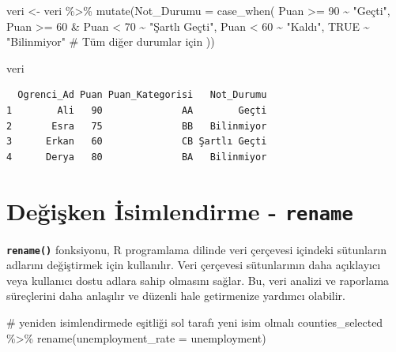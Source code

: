 \documentclass[
  letterpaper,
  DIV=11,
  numbers=noendperiod]{scrreprt}
\newenvironment{Shaded}{\begin{snugshade}}{\end{snugshade}}
\newcommand{\AttributeTok}[1]{\textcolor[rgb]{0.40,0.45,0.13}{#1}}
\newcommand{\CommentTok}[1]{\textcolor[rgb]{0.37,0.37,0.37}{#1}}
\newcommand{\ConstantTok}[1]{\textcolor[rgb]{0.56,0.35,0.01}{#1}}
\newcommand{\DecValTok}[1]{\textcolor[rgb]{0.68,0.00,0.00}{#1}}
\newcommand{\FunctionTok}[1]{\textcolor[rgb]{0.28,0.35,0.67}{#1}}
\newcommand{\NormalTok}[1]{\textcolor[rgb]{0.00,0.23,0.31}{#1}}
\newcommand{\OtherTok}[1]{\textcolor[rgb]{0.00,0.23,0.31}{#1}}
\newcommand{\SpecialCharTok}[1]{\textcolor[rgb]{0.37,0.37,0.37}{#1}}
\newcommand{\StringTok}[1]{\textcolor[rgb]{0.13,0.47,0.30}{#1}}
\begin{document}
\begin{Shaded}
\begin{Highlighting}[]
\NormalTok{veri }\OtherTok{\textless{}{-}}\NormalTok{ veri }\SpecialCharTok{\%\textgreater{}\%}
  \FunctionTok{mutate}\NormalTok{(}\AttributeTok{Not\_Durumu =} \FunctionTok{case\_when}\NormalTok{(}
\NormalTok{    Puan }\SpecialCharTok{\textgreater{}=} \DecValTok{90} \SpecialCharTok{\textasciitilde{}} \StringTok{"Geçti"}\NormalTok{,}
\NormalTok{    Puan }\SpecialCharTok{\textgreater{}=} \DecValTok{60} \SpecialCharTok{\&}\NormalTok{ Puan }\SpecialCharTok{\textless{}} \DecValTok{70} \SpecialCharTok{\textasciitilde{}} \StringTok{"Şartlı Geçti"}\NormalTok{,}
\NormalTok{    Puan }\SpecialCharTok{\textless{}} \DecValTok{60} \SpecialCharTok{\textasciitilde{}} \StringTok{"Kaldı"}\NormalTok{,}
    \ConstantTok{TRUE} \SpecialCharTok{\textasciitilde{}} \StringTok{"Bilinmiyor"}  \CommentTok{\# Tüm diğer durumlar için}
\NormalTok{  ))}

\NormalTok{veri}
\end{Highlighting}
\end{Shaded}

\begin{verbatim}
  Ogrenci_Ad Puan Puan_Kategorisi   Not_Durumu
1        Ali   90              AA        Geçti
2       Esra   75              BB   Bilinmiyor
3      Erkan   60              CB Şartlı Geçti
4      Derya   80              BA   Bilinmiyor
\end{verbatim}

\section*{\texorpdfstring{Değişken İsimlendirme -
\texttt{rename}}{Değişken İsimlendirme - rename}}\label{deux11fiux15fken-isimlendirme---rename}


\textbf{\texttt{rename()}} fonksiyonu, R programlama dilinde veri
çerçevesi içindeki sütunların adlarını değiştirmek için kullanılır. Veri
çerçevesi sütunlarının daha açıklayıcı veya kullanıcı dostu adlara sahip
olmasını sağlar. Bu, veri analizi ve raporlama süreçlerini daha
anlaşılır ve düzenli hale getirmenize yardımcı olabilir.

\begin{Shaded}
\begin{Highlighting}[]
\CommentTok{\# yeniden isimlendirmede eşitliği sol tarafı yeni isim olmalı}
\NormalTok{counties\_selected }\SpecialCharTok{\%\textgreater{}\%}
\FunctionTok{rename}\NormalTok{(}\AttributeTok{unemployment\_rate =}\NormalTok{ unemployment)}
\end{Highlighting}
\end{Shaded}
\end{document}
